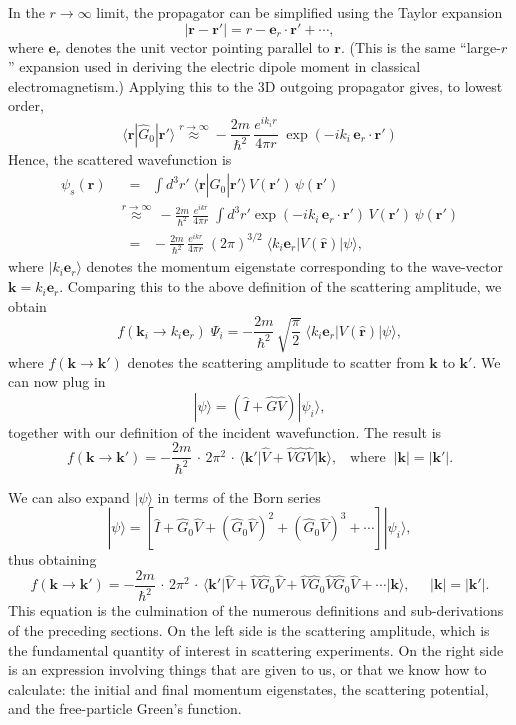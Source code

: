 \documentclass[pra,11pt]{revtex4}
\begin{document}
In the $r\rightarrow\infty$ limit, the propagator can be simplified
using the Taylor expansion
$$|\mathbf{r} - \mathbf{r}'| = r - \mathbf{e}_r \cdot \mathbf{r}' + \cdots,$$
where $\mathbf{e}_r$ denotes the unit vector pointing parallel to
$\mathbf{r}$.  (This is the same ``large-$r$'' expansion used in
deriving the electric dipole moment in classical electromagnetism.)
Applying this to the 3D outgoing propagator gives, to lowest order,
$$\langle\mathbf{r}|\hat{G}_0|\mathbf{r}'\rangle \overset{r\rightarrow\infty}{\approx} - \frac{2m}{\hbar^2}\, \frac{e^{ik_ir}}{4\pi r}\; \exp\left(-ik_i \,\mathbf{e}_r \cdot \mathbf{r}'\right)$$
Hence, the scattered wavefunction is
$$\begin{aligned}\psi_s(\mathbf{r}) &\;\;= \;\; \int d^3r'\; \langle\mathbf{r}|\hat{G}_0|\mathbf{r}'\rangle\, V(\mathbf{r}')\, \psi(\mathbf{r}') \\ &\overset{r\rightarrow\infty}{\approx} \, - \frac{2m}{\hbar^2} \, \frac{e^{ikr}}{4\pi r}\; \int d^3r' \exp\left(-ik_i \,\mathbf{e}_r \cdot \mathbf{r}'\right)\, V(\mathbf{r}')\, \psi(\mathbf{r}') \\ &\;\;=\;\; - \frac{2m}{\hbar^2} \, \frac{e^{ikr}}{4\pi r} \; (2\pi)^{3/2} \; \big\langle k_i \mathbf{e}_r \big|V(\hat{\mathbf{r}})\big|\psi\big\rangle, \end{aligned}$$
where $|k_i\mathbf{e}_r \rangle$ denotes the momentum eigenstate
corresponding to the wave-vector $\mathbf{k} = k_i\mathbf{e}_r$.
Comparing this to the above definition of the scattering amplitude, we
obtain
$$f(\mathbf{k}_i\rightarrow k_i\mathbf{e}_r )\; \Psi_i = - \frac{2m}{\hbar^2} \,\sqrt{\frac{\pi}{2}} \; \big\langle k_i \mathbf{e}_r \big|V(\hat{\mathbf{r}})\big|\psi\big\rangle,$$
where $f(\mathbf{k}\rightarrow \mathbf{k}')$ denotes the scattering
amplitude to scatter from $\mathbf{k}$ to $\mathbf{k}'$.  We can now
plug in
$$|\psi\rangle = \left(\hat{I} + \hat{G}\hat{V}\right)|\psi_i\rangle,$$
together with our definition of the incident wavefunction.  The result
is
$$f(\mathbf{k}\rightarrow \mathbf{k}') = - \frac{2m}{\hbar^2} \,\cdot \, 2\pi^2 \,\cdot\, \big\langle \mathbf{k}'\big| \hat{V} + \hat{V}\hat{G} \hat{V} \big|\mathbf{k}\big\rangle, \;\;\;\mathrm{where} \;\; |\mathbf{k}| = |\mathbf{k}'|.$$

We can also expand $|\psi\rangle$ in terms of the Born series
$$|\psi\rangle = \left[\hat{I} + \hat{G}_0 \hat{V} + (\hat{G}_0 \hat{V})^2 + (\hat{G}_0 \hat{V})^3 + \cdots\right]|\psi_i\rangle,$$
thus obtaining
$$\boxed{\;\;\;f(\mathbf{k}\rightarrow \mathbf{k}') = - \frac{2m}{\hbar^2} \,\cdot \, 2\pi^2 \,\cdot\, \big\langle \mathbf{k}'\big| \hat{V} + \hat{V}\hat{G}_0 \hat{V} + \hat{V} \hat{G}_0 \hat{V} \hat{G}_0\hat{V} + \cdots \big|\mathbf{k}\big\rangle, \;\;\; \;\; |\mathbf{k}| = |\mathbf{k}'|.\;\;\;}$$
This equation is the culmination of the numerous definitions and
sub-derivations of the preceding sections.  On the left side is the
scattering amplitude, which is the fundamental quantity of interest in
scattering experiments.  On the right side is an expression involving
things that are given to us, or that we know how to calculate: the
initial and final momentum eigenstates, the scattering potential, and
the free-particle Green's function.
\end{document}
